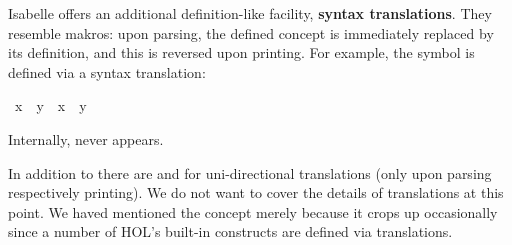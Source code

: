 %
\begin{isabellebody}%
\def\isabellecontext{Translations}%
%
%
\begin{isamarkuptext}%
\label{sec:def-translations}
Isabelle offers an additional definition-like facility,
\textbf{syntax translations}.
They resemble makros: upon parsing, the defined concept is immediately
replaced by its definition, and this is reversed upon printing. For example,
the symbol \isa{{\isasymnoteq}} is defined via a syntax translation:%
\end{isamarkuptext}%
\ {\isachardoublequote}x\ {\isasymnoteq}\ y{\isachardoublequote}\ {\isasymrightleftharpoons}\ {\isachardoublequote}{\isasymnot}{\isacharparenleft}x\ {\isacharequal}\ y{\isacharparenright}{\isachardoublequote}%
\begin{isamarkuptext}%
\noindent
Internally, \isa{{\isasymnoteq}} never appears.

In addition to \isa{{\isasymrightleftharpoons}} there are
\isa{{\isasymrightharpoonup}}
and \isa{{\isasymleftharpoondown}}
for uni-directional translations (only upon
parsing respectively printing).  We do not want to cover the details of
translations at this point.  We haved mentioned the concept merely because it
crops up occasionally since a number of HOL's built-in constructs are defined
via translations.%
\end{isamarkuptext}%
\end{isabellebody}%
